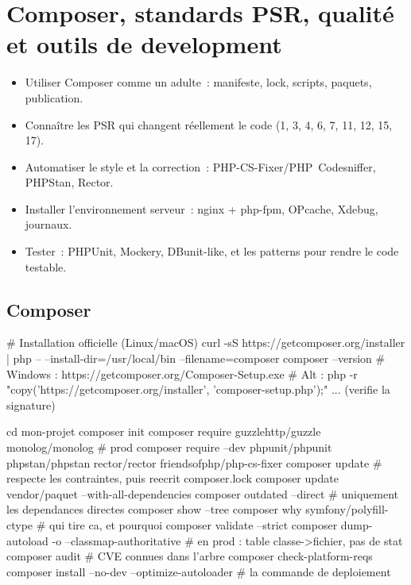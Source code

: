 \documentclass[12pt,a4paper,twoside,openright]{book}
\begin{document}
\chapter{Composer, standards PSR, qualit\'e et outils de development}
\label{ch-php-composer}

\begin{objectif}
\begin{itemize}
  \item Utiliser Composer comme un adulte~: manifeste, lock, scripts, paquets, publication.
  \item Conna\^itre les PSR qui changent r\'eellement le code (1, 3, 4, 6, 7, 11, 12, 15, 17).
  \item Automatiser le style et la correction~: PHP-CS-Fixer/PHP~Codesniffer, PHPStan, Rector.
  \item Installer l'environnement serveur~: nginx + php-fpm, OPcache, Xdebug, journaux.
  \item Tester~: PHPUnit, Mockery, DBunit-like, et les patterns pour rendre le code testable.
\end{itemize}
\end{objectif}

\section{Composer}

\begin{terminal}
# Installation officielle (Linux/macOS)
curl -sS https://getcomposer.org/installer | php -- --install-dir=/usr/local/bin --filename=composer
composer --version
# Windows : https://getcomposer.org/Composer-Setup.exe
# Alt : php -r "copy('https://getcomposer.org/installer', 'composer-setup.php');" ... (verifie la signature)

cd mon-projet
composer init
composer require guzzlehttp/guzzle monolog/monolog          # prod
composer require --dev phpunit/phpunit phpstan/phpstan rector/rector friendsofphp/php-cs-fixer
composer update                              # respecte les contraintes, puis reecrit composer.lock
composer update vendor/paquet --with-all-dependencies
composer outdated --direct                   # uniquement les dependances directes
composer show --tree
composer why symfony/polyfill-ctype          # qui tire ca, et pourquoi
composer validate --strict
composer dump-autoload -o --classmap-authoritative    # en prod : table classe->fichier, pas de stat
composer audit                               # CVE connues dans l'arbre
composer check-platform-reqs
composer install --no-dev --optimize-autoloader        # la commande de deploiement
\end{terminal}
\end{document}
